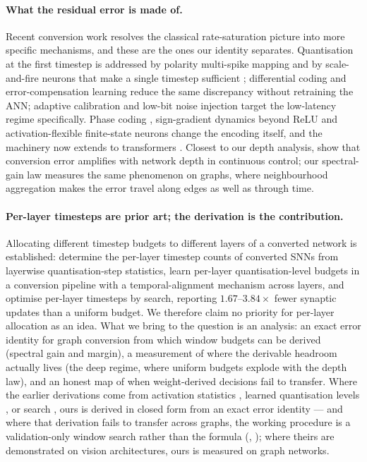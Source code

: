 \paragraph{What the residual error is made of.} Recent conversion work resolves the classical
rate-saturation picture into more specific mechanisms, and these are the ones our identity
separates. Quantisation at the first timestep is addressed by polarity multi-spike mapping
\citep{zhang2025quantization} and by scale-and-fire neurons that make a single timestep sufficient
\citep{chen2025onetimestep}; differential coding \citep{huang2025differential} and
error-compensation learning \citep{liu2025errorcomp} reduce the same discrepancy without retraining
the ANN; adaptive calibration \citep{wang2024adaptivecal} and low-bit noise injection
\citep{li2024noiseadaptor} target the low-latency regime specifically. Phase coding
\citep{hwang2024onespike}, sign-gradient dynamics beyond ReLU \citep{oh2024signgd} and
activation-flexible finite-state neurons \citep{jia2026activation} change the encoding itself, and
the machinery now extends to transformers \citep{huang2025spiketrans,wang2025trainingfree}. Closest
to our depth analysis, \citet{xu2026erroramp} show that conversion error amplifies with network
depth in continuous control; our spectral-gain law measures the same phenomenon on graphs, where
neighbourhood aggregation makes the error travel along edges as well as through time.

\paragraph{Per-layer timesteps are prior art; the derivation is the contribution.} Allocating
different timestep budgets to different layers of a converted network is established:
\citet{ramesh2025pascal} determine the per-layer timestep counts of converted SNNs from layerwise
quantisation-step statistics, \citet{guo2026mixed} learn per-layer quantisation-level budgets in a
conversion pipeline with a temporal-alignment mechanism across layers, and
\citet{nallathambi2022ldsnn} optimise per-layer timesteps by search, reporting $1.67$--$3.84\times$
fewer synaptic updates than a uniform budget. We therefore claim no priority for per-layer
allocation as an idea. What we bring to the question is an analysis: an exact error identity for
graph conversion from which window budgets can be derived (spectral gain and margin), a
measurement of where the derivable headroom actually lives (the deep regime, where uniform budgets
explode with the depth law), and an honest map of when weight-derived decisions fail to transfer.
Where the earlier derivations come from activation statistics
\citep{ramesh2025pascal}, learned quantisation levels \citep{guo2026mixed}, or search
\citep{nallathambi2022ldsnn}, ours is derived in closed form from an exact error identity ---
and where that derivation fails to transfer across graphs, the working procedure is a
validation-only window search rather than the formula (,
); where theirs are demonstrated
on vision architectures, ours is measured on graph networks.


